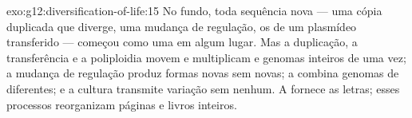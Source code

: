 \begin{solution}{exo:g12:diversification-of-life:15}
No fundo, toda sequência nova --- uma cópia duplicada que diverge, uma
mudança de regulação, os  de um plasmídeo transferido --- começou
como uma  em algum lugar. Mas a duplicação, a transferência e a
poliploidia movem e multiplicam  e genomas inteiros de uma vez; a
mudança de regulação produz formas novas sem  novas; a
 combina genomas de  diferentes; e a cultura transmite
variação sem  nenhum. A  fornece as letras; esses processos
reorganizam páginas e livros inteiros.
\end{solution}

